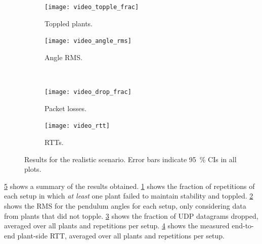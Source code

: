 \begin{figure}[t]
    \centering
    \begin{subfigure}[h]{.22\textwidth}
        \centering
        \texttt{[image: video\_topple\_frac]}
        \caption{Toppled plants.}\label{fig:video:toppled}
    \end{subfigure}%
    \hfill%
    \begin{subfigure}[h]{.22\textwidth}
        \centering
        \texttt{[image: video\_angle\_rms]}
        \caption{Angle \ac{RMS}.}\label{fig:video:rms}
    \end{subfigure}\\
    \begin{subfigure}[h]{.22\textwidth}
        \centering
        \texttt{[image: video\_drop\_frac]}
        \caption{Packet losses.}\label{fig:video:drop}
    \end{subfigure}%
    \hfill%
    \begin{subfigure}[h]{.22\textwidth}
        \centering
        \texttt{[image: video\_rtt]}
        \caption{\acsp{RTT}.}\label{fig:video:rtt}
    \end{subfigure}%
    \caption{
        Results for the realistic scenario.
        Error bars indicate \SI{95}{\percent} \acp{CI} in all plots.
    }\label{fig:video:results}
\end{figure}

\cref{fig:video:results} shows a summary of the results obtained.
\cref{fig:video:toppled} shows the fraction of repetitions of each setup in which \emph{at least} one plant failed to maintain stability and toppled.
\cref{fig:video:rms} shows the \ac{RMS} for the pendulum angles for each setup, only considering data from plants that did not topple.
\cref{fig:video:drop} shows the fraction of \ac{UDP} datagrams dropped, averaged over all plants and repetitions per setup.
\cref{fig:video:rtt} shows the measured end-to-end plant-side \ac{RTT}, averaged over all plants and repetitions per setup.

